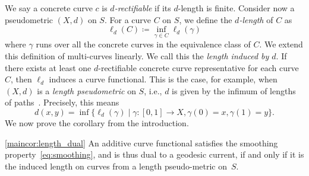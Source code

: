 We say
a concrete curve $c$ is \emph{$d$-rectifiable} if its $d$-length is finite.
Consider now a pseudometric $(X,d)$ on $S$.
For a curve $C$ on $S$, we define the \emph{$d$-length} of $C$ as
\[
\ell_d(C) \coloneqq \inf_{\gamma \in C} \ell_d(\gamma)
\]
where $\gamma$ runs over all the concrete curves in the equivalence class of $C$.
We extend this definition of multi-curves linearly.
We call this the \emph{length induced by $d$}.
If there exists at least one $d$-rectifiable concrete curve
representative for each curve $C$, then $\ell_d$ induces a curve
functional. This is the case, for example, when  $(X,d)$ is a
\emph{length pseudometric} on $S$, i.e.,
$d$ is given by the infimum of lengths of paths~\cite[Chapter~I.2, Definition~3.1]{BH11:NonPosCurvature}. Precisely, this means
\begin{equation}\label{eq:length-metric}
d(x,y) = \inf \{ \ell_d(\gamma) \mid \gamma\colon [0,1] \to X, \gamma(0)=x, \gamma(1)=y\}.
\end{equation}
We now prove the corollary from the introduction.
\begin{taggedcor}{\ref{maincor:length_dual}}
  An additive curve functional satisfies the smoothing
  property~\eqref{eq:smoothing}, and is thus dual to a geodesic
  current, if and only if it is the induced length on curves from a
  length pseudo-metric on~$S$.
\end{taggedcor}
